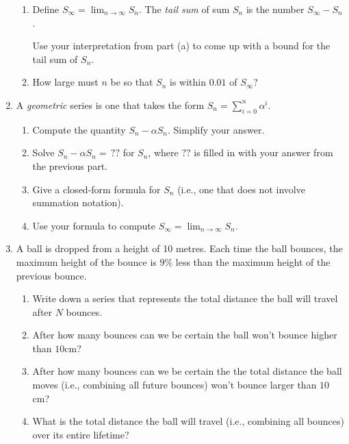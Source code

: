 \begin{enumerate}
\begin{enumerate}
            \item Define $S_\infty=\lim_{n\to\infty}S_n$. The \emph{tail sum} of sum $S_n$
			is the number $S_\infty - S_n$. 

			Use your interpretation from part (a) to come up with a bound for the tail sum of $S_n$.

            \item How large must $n$ be so that $S_n$ is within $0.01$ of $S_\infty$?
		\end{enumerate}

		\item A \emph{geometric} series is one that takes the form $S_n=\sum_{i=0}^n \alpha^i$.
		\begin{enumerate}
			\item Compute the quantity $S_n-\alpha S_n$. Simplify your answer.
			\item Solve $S_n-\alpha S_n=\,??$ for $S_n$, where $??$ is filled in with your answer from the previous part. 
			\item Give a closed-form formula for $S_n$ (i.e., one that does not involve summation notation).
			\item Use your formula to compute $S_\infty =\lim_{n\to\infty} S_n$.
		\end{enumerate}

        \item A ball is dropped from a height of 10 metres. Each time the ball bounces, the maximum height of the bounce is $9$\% less than the maximum height of the previous bounce. 
        
        \begin{enumerate}
            \item Write down a series that represents the total distance the ball will travel after $N$ bounces.
            \item After how many bounces can we be certain the ball won't bounce higher than $10$cm?
            \item After how many bounces can we be certain the the total distance the ball moves (i.e., combining all future bounces) won't bounce larger than $10$cm?
            \item What is the total distance the ball will travel (i.e., combining all bounces)
			over its entire lifetime?
        \end{enumerate}

\end{enumerate}